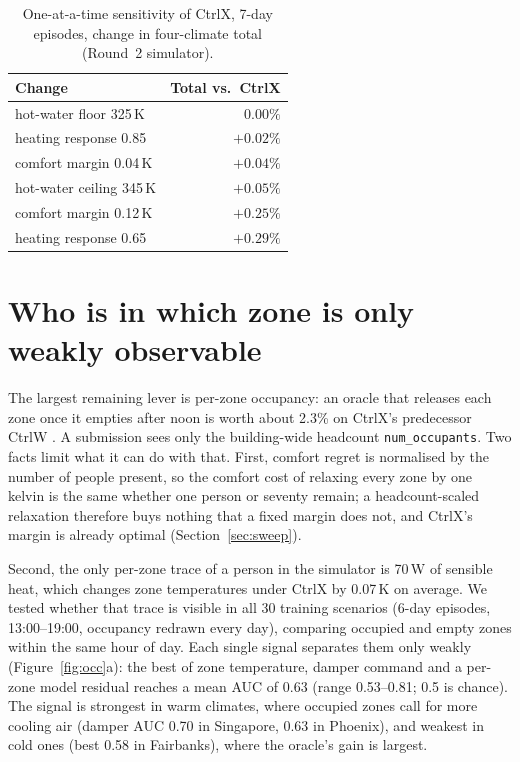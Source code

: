 \documentclass{article}
\begin{document}
\begin{table}[t]
\centering
\caption{One-at-a-time sensitivity of CtrlX, 7-day episodes, change in four-climate total (Round~2 simulator).}
\label{tab:sweep}
\small
\begin{tabular}{lr}
\toprule
Change & Total vs.\ CtrlX \\
\midrule
hot-water floor 325\,K & $0.00\%$ \\
heating response 0.85 & $+0.02\%$ \\
comfort margin 0.04\,K & $+0.04\%$ \\
hot-water ceiling 345\,K & $+0.05\%$ \\
comfort margin 0.12\,K & $+0.25\%$ \\
heating response 0.65 & $+0.29\%$ \\
\bottomrule
\end{tabular}
\end{table}

\section{Who is in which zone is only weakly observable}\label{sec:occ}
The largest remaining lever is per-zone occupancy: an oracle that releases each zone once it empties after noon is worth about 2.3\% on CtrlX's predecessor CtrlW \cite{morev2026}. A submission sees only the building-wide headcount \texttt{num\_occupants}. Two facts limit what it can do with that. First, comfort regret is normalised by the number of people present, so the comfort cost of relaxing every zone by one kelvin is the same whether one person or seventy remain; a headcount-scaled relaxation therefore buys nothing that a fixed margin does not, and CtrlX's margin is already optimal (Section~\ref{sec:sweep}). 

Second, the only per-zone trace of a person in the simulator is 70\,W of sensible heat, which changes zone temperatures under CtrlX by 0.07\,K on average. We tested whether that trace is visible in all 30 training scenarios (6-day episodes, 13:00--19:00, occupancy redrawn every day), comparing occupied and empty zones within the same hour of day. Each single signal separates them only weakly (Figure~\ref{fig:occ}a): the best of zone temperature, damper command and a per-zone model residual reaches a mean AUC of 0.63 (range 0.53--0.81; 0.5 is chance). The signal is strongest in warm climates, where occupied zones call for more cooling air (damper AUC 0.70 in Singapore, 0.63 in Phoenix), and weakest in cold ones (best 0.58 in Fairbanks), where the oracle's gain is largest. 
\end{document}
